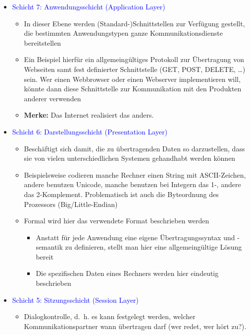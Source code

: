 \begin{itemize}
    \item \textcolor{blue}{Schicht 7: Anwendungsschicht (Application Layer)}
    \begin{itemize}
        \item In dieser Ebene werden (Standard-)Schnittstellen zur Verfügung gestellt, die bestimmten Anwendungstypen ganze Kommunikationsdienste bereitstellen
        \item Ein Beispiel hierfür ein allgemeingültiges Protokoll zur Übertragung von Webseiten samt fest definierter Schnittstelle (GET, POST, DELETE, …) sein.
        Wer einen Webbrowser oder einen Webserver implementieren will, könnte dann diese Schnittstelle zur Kommunikation mit den Produkten anderer verwenden
        \item \textbf{Merke:} Das Internet realisiert das anders.
    \end{itemize}
    \item \textcolor{blue}{Schicht 6: Darstellungsschicht (Presentation Layer)}
    \begin{itemize}
        \item Beschäftigt sich damit, die zu übertragenden Daten so darzustellen, dass sie von vielen unterschiedlichen Systemen gehandhabt werden können
        \item Beispielsweise codieren manche Rechner einen String mit ASCII-Zeichen, andere benutzen Unicode, manche benutzen bei Integern das 1-, andere das 2-Komplement.
        Problematisch ist auch die Byteordnung des Prozessors (Big/Little-Endian)
        \item Formal wird hier das verwendete Format beschrieben werden
        \begin{itemize}
            \item Anstatt für jede Anwendung eine eigene Übertragungssyntax und -semantik zu definieren,
            stellt man hier eine allgemeingültige Lösung bereit
            \item Die spezifischen Daten eines Rechners werden hier eindeutig beschrieben
        \end{itemize}
    \end{itemize}
    \item \textcolor{blue}{Schicht 5: Sitzungsschicht (Session Layer)}
    \begin{itemize}
        \item Dialogkontrolle, d.\ h. es kann festgelegt werden, welcher Kommunikationspartner wann übertragen darf (wer redet, wer hört zu?).

\end{itemize}
\end{itemize}
